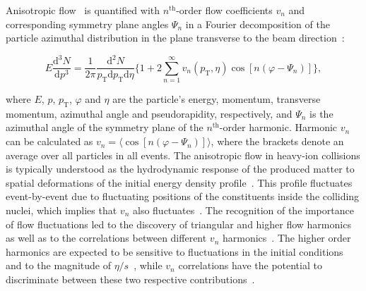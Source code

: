 Anisotropic flow~\cite{Ollitrault:1992bk} is quantified with $n^{\mathrm{th}}$-order flow coefficients $v_n$ and corresponding symmetry plane angles $\Psi_n$ in a Fourier decomposition of the particle azimuthal distribution in the plane transverse to the beam direction~\cite{Voloshin:1994mz,Poskanzer:1998yz}:

\begin{equation}
E\frac{\mathrm{d}^3N}{\mathrm{d}p^3} = \frac{1}{2\pi}\frac{\mathrm{d}^2N}{p_{\mathrm{T}}\mathrm{d}p_{\mathrm{T}}\mathrm{d}\eta} \Big\{1 + 2\sum_{n=1}^{\infty} v_n(p_{\mathrm{T}},\eta) \cos[n(\varphi - \Psi_n)]\Big\},
\label{Eq:Fourier}
\end{equation}

\noindent where $E$, $p$, $p_{\mathrm{T}}$, $\varphi$ and $\eta$ are the particle's energy, momentum, transverse momentum, azimuthal angle and pseudorapidity, respectively, and $\Psi_n$ is the azimuthal angle of the symmetry plane of the $n^{\mathrm{th}}$-order harmonic. Harmonic $v_n$ can be calculated as $v_{n} = \langle{\cos[n(\varphi - \Psi_n)]}\rangle$, where the brackets denote an average over all particles in all events.
The anisotropic flow in heavy-ion collisions is typically understood as the hydrodynamic response of the produced matter to spatial deformations of the initial energy density profile~\cite{Floerchinger:2013tya}.
This profile fluctuates event-by-event due to fluctuating positions of the constituents inside the colliding nuclei, which implies that $v_n$ also fluctuates~\cite{Miller:2003kd,Alver:2006wh}.
The recognition of the importance of flow fluctuations led to the discovery of triangular and higher flow harmonics~\cite{Alver:2010gr,ALICE:2011ab} as well as to the correlations between different $v_{n}$ harmonics~\cite{Niemi:2012aj,Aad:2014fla}.
The higher order harmonics are expected to be sensitive to fluctuations in the initial conditions and to the magnitude of $\eta/s$~\cite{Alver:2010dn,Luzum:2012wu}, while $v_{n}$ correlations have the potential to discriminate between these two respective contributions~\cite{Niemi:2012aj}.

